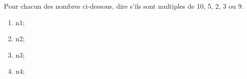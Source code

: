 \documentclass[exercice]{thedocument}%
\begin{document}
%
Pour chacun des nombres ci-dessous, dire s'ils sont multiples de 10, 5, 2, 3 ou 9.
\begin{enumerate}
    \item\<n1;
    \item\<n2;
    \item\<n3;
    \item\<n4;
\end{enumerate}
\end{document}
